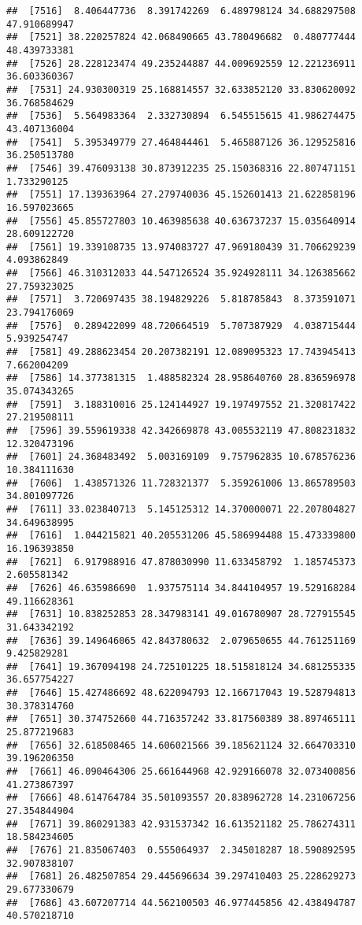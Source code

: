 \documentclass[
]{article}
\begin{document}
\begin{verbatim}
##  [7516]  8.406447736  8.391742269  6.489798124 34.688297508 47.910689947
##  [7521] 38.220257824 42.068490665 43.780496682  0.480777444 48.439733381
##  [7526] 28.228123474 49.235244887 44.009692559 12.221236911 36.603360367
##  [7531] 24.930300319 25.168814557 32.633852120 33.830620092 36.768584629
##  [7536]  5.564983364  2.332730894  6.545515615 41.986274475 43.407136004
##  [7541]  5.395349779 27.464844461  5.465887126 36.129525816 36.250513780
##  [7546] 39.476093138 30.873912235 25.150368316 22.807471151  1.733290125
##  [7551] 17.139363964 27.279740036 45.152601413 21.622858196 16.597023665
##  [7556] 45.855727803 10.463985638 40.636737237 15.035640914 28.609122720
##  [7561] 19.339108735 13.974083727 47.969180439 31.706629239  4.093862849
##  [7566] 46.310312033 44.547126524 35.924928111 34.126385662 27.759323025
##  [7571]  3.720697435 38.194829226  5.818785843  8.373591071 23.794176069
##  [7576]  0.289422099 48.720664519  5.707387929  4.038715444  5.939254747
##  [7581] 49.288623454 20.207382191 12.089095323 17.743945413  7.662004209
##  [7586] 14.377381315  1.488582324 28.958640760 28.836596978 35.074343265
##  [7591]  3.188310016 25.124144927 19.197497552 21.320817422 27.219508111
##  [7596] 39.559619338 42.342669878 43.005532119 47.808231832 12.320473196
##  [7601] 24.368483492  5.003169109  9.757962835 10.678576236 10.384111630
##  [7606]  1.438571326 11.728321377  5.359261006 13.865789503 34.801097726
##  [7611] 33.023840713  5.145125312 14.370000071 22.207804827 34.649638995
##  [7616]  1.044215821 40.205531206 45.586994488 15.473339800 16.196393850
##  [7621]  6.917988916 47.878030990 11.633458792  1.185745373  2.605581342
##  [7626] 46.635986690  1.937575114 34.844104957 19.529168284 49.116628361
##  [7631] 10.838252853 28.347983141 49.016780907 28.727915545 31.643342192
##  [7636] 39.149646065 42.843780632  2.079650655 44.761251169  9.425829281
##  [7641] 19.367094198 24.725101225 18.515818124 34.681255335 36.657754227
##  [7646] 15.427486692 48.622094793 12.166717043 19.528794813 30.378314760
##  [7651] 30.374752660 44.716357242 33.817560389 38.897465111 25.877219683
##  [7656] 32.618508465 14.606021566 39.185621124 32.664703310 39.196206350
##  [7661] 46.090464306 25.661644968 42.929166078 32.073400856 41.273867397
##  [7666] 48.614764784 35.501093557 20.838962728 14.231067256 27.354844904
##  [7671] 39.860291383 42.931537342 16.613521182 25.786274311 18.584234605
##  [7676] 21.835067403  0.555064937  2.345018287 18.590892595 32.907838107
##  [7681] 26.482507854 29.445696634 39.297410403 25.228629273 29.677330679
##  [7686] 43.607207714 44.562100503 46.977445856 42.438494787 40.570218710

\end{verbatim}
\end{document}
